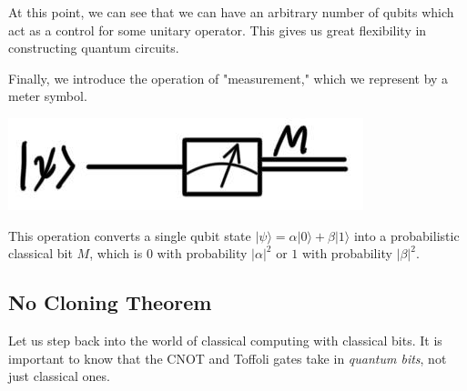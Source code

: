 \documentclass{article}
\begin{document}
    At this point, we can see that we can have an arbitrary number of qubits which act as a control for some unitary operator. This gives us great flexibility in constructing quantum circuits.

    \begin{definition}[Measurement]
      Finally, we introduce the operation of "measurement," which we represent by a meter symbol.
      \begin{center}
        \includegraphics[scale=0.3]{img/Measurement_gate.jpg}
      \end{center}
      This operation converts a single qubit state $| \psi \rangle = \alpha |0\rangle + \beta |1\rangle$ into a probabilistic classical bit $M$, which is $0$ with probability $|\alpha|^2$ or $1$ with probability $|\beta|^2$. 
    \end{definition}

  \subsection{No Cloning Theorem} 

    Let us step back into the world of classical computing with classical bits. It is important to know that the CNOT and Toffoli gates take in \textit{quantum bits}, not just classical ones.
\end{document}

